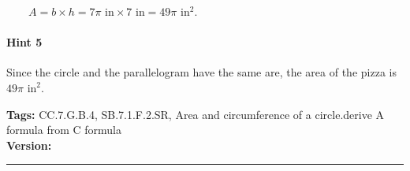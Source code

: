 \documentclass[twocolumn,10pt]{article}
\begin{document}
$\qquad A= b \times h = 7\pi\text{ in}\times 7\text{ in} = 49\pi\text{ in}^2$.


\paragraph{Hint 5}Since the circle and the parallelogram have the same are, the area of the pizza is $49\pi\text{ in}^2$.




\medskip
\noindent
\textbf{Tags:} {\footnotesize CC.7.G.B.4, SB.7.1.F.2.SR, Area and circumference of a circle.derive A formula from C formula}\\
\textbf{Version:} \DIFdelbegin {}\DIFdelend \DIFaddbegin {}\DIFaddend \smallskip\hrule
\end{document}
